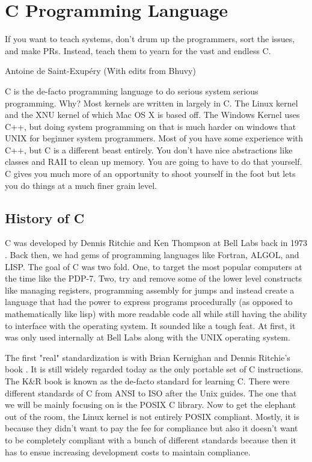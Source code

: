 \chapter{C Programming Language}

\epigraph{If you want to teach systems, don't drum up the programmers, sort the issues, and make PRs. Instead, teach them to yearn for the vast and endless C.}{Antoine de Saint-Exup\'{e}ry (With edits from Bhuvy)}

\gls{C} is the de-facto programming language to do serious system serious programming.
Why? Most kernels are written in largely in C.
The \gls{Linux kernel} \cite{Love} and the XNU kernel \citet{xnukernel} of which Mac OS X is based off.
The Windows Kernel uses C++, but doing system programming on that is much harder on windows that UNIX for beginner system programmers.
Most of you have some experience with C++, but C is a different beast entirely.
You don't have nice abstractions like classes and RAII to clean up memory.
You are going to have to do that yourself.
C gives you much more of an opportunity to shoot yourself in the foot but lets you do things at a much finer grain level.

\section{History of C}

C was developed by Dennis Ritchie and Ken Thompson at Bell Labs back in 1973 \cite{Ritchie:1993:DCL:155360.155580}.
Back then, we had gems of programming languages like Fortran, ALGOL, and LISP.
The goal of C was two fold.
One, to target the most popular computers at the time like the PDP-7.
Two, try and remove some of the lower level constructs like managing registers, programming assembly for jumps and instead create a language that had the power to express programs procedurally (as opposed to mathematically like lisp) with more readable code all while still having the ability to interface with the operating system.
It sounded like a tough feat.
At first, it was only used internally at Bell Labs along with the UNIX operating system.

The first "real" standardization is with Brian Kernighan and Dennis Ritchie's book \cite{kernighan1988c}. It is still widely regarded today as the only \gls{portable} set of C instructions. The K\&R book is known as the de-facto standard for learning C.  There were different standards of C from ANSI to ISO after the Unix guides. The one that we will be mainly focusing on is the \gls{POSIX} C library. Now to get the elephant out of the room, the Linux kernel is not entirely POSIX compliant. Mostly, it is because they didn't want to pay the fee for compliance but also it doesn't want to be completely compliant with a bunch of different standards because then it has to ensue increasing development costs to maintain compliance.

